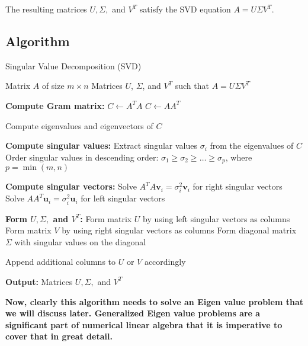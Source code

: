 The resulting matrices \( U, \Sigma, \) and \( V^T \) satisfy the SVD equation \( A = U \Sigma V^T \).



\subsection{Algorithm}

\begin{algorithm}
\caption{Singular Value Decomposition (SVD)}
\begin{algorithmic}[1]
    \Require Matrix $A$ of size $m \times n$
    \Ensure Matrices $U$, $\Sigma$, and $V^T$ such that $A = U \Sigma V^T$
    
    \State \textbf{Compute Gram matrix:}
        \State $C \gets A^T A$
    \Else
        \State $C \gets A A^T$
    \EndIf
    
    \State Compute eigenvalues and eigenvectors of $C$ 
    
    \State \textbf{Compute singular values:}
    \State Extract singular values $\sigma_i$ from the eigenvalues of $C$
    \State Order singular values in descending order: $\sigma_1 \geq \sigma_2 \geq \ldots \geq \sigma_p$, where $p = \min(m, n)$
    
    \State \textbf{Compute singular vectors:}
        \State Solve $A^TA \mathbf{v}_i = \sigma_i^2 \mathbf{v}_i$ for right singular vectors
        \State Solve $AA^T \mathbf{u}_i = \sigma_i^2 \mathbf{u}_i$ for left singular vectors
    \EndFor
    
    \State \textbf{Form $U, \Sigma, $ and $V^T$:}
    \State Form matrix $U$ by using left singular vectors as columns
    \State Form matrix $V$ by using right singular vectors as columns
    \State Form diagonal matrix $\Sigma$ with singular values on the diagonal
    
        \State Append additional columns to $U$ or $V$ accordingly 
    \EndIf
    
    \State \textbf{Output:} Matrices $U, \Sigma, $ and $V^T$
\end{algorithmic}
\end{algorithm}


\textbf{Now, clearly this algorithm needs to solve an Eigen value problem that we will discuss later. Generalized Eigen value problems are a significant part of numerical linear algebra that it is imperative to cover that in great detail.}




